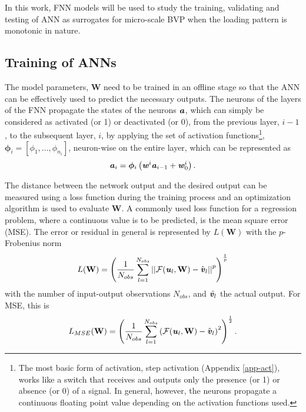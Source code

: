 In this work, FNN models will be used to study the training, validating and testing of ANN as surrogates for micro-scale BVP when the loading pattern is monotonic in nature.

\subsection{Training of ANNs}\label{nn-ann-train}

The model parameters, $\textbf{W} $ need to be trained in an offline stage so that the ANN can be effectively used to predict the necessary outputs. The neurons of the layers of the FNN propagate the states of the neurons $ \textbf{\textit{a}} $, which can simply be considered as activated (or 1) or deactivated (or 0), from the previous layer, $ i-1 $, to the subsequent layer, $ i $, by applying the set of activation functions\footnote{The most basic form of activation, step activation (Appendix \ref{app-act}), works like a switch that receives and outputs only the presence (or 1) or absence (or 0) of a signal. In general, however, the neurons propagate a continuous floating point value depending on the activation functions used.}, $ \bm\phi_{i}=[\phi_1,...,\phi_{n_{i}}] $, neuron-wise on the entire layer, which can be represented as
\begin{equation}\label{eq-nn-state}
\textbf{\textit{a}}_i=\bm\phi_{i}\left(\textbf{\textit{w}}^i\textbf{\textit{a}}_{i-1}+\textbf{\textit{w}}_0^i\right).
\end{equation}

The distance between the network output and the desired output can be measured using a loss function during the training process and an optimization algorithm is used to evaluate $ \textbf{W} $. A commonly used loss function for a regression problem, where a continuous value is to be predicted, is the mean square error (MSE). The error or residual in general is represented by $ L(\textbf{W}) $ with the $ p $-Frobenius norm
\begin{equation}\label{eq-nn-loss}
L(\textbf{W})=\left(\frac{1}{N_{obs}}\sum_{l=1}^{N_{obs}}\left|\left|\mathcal{F}(\textbf{\textit{u}}_l,\textbf{W})-\hat{\textbf{\textit{v}}}_l\right|\right|^p\right)^{\frac{1}{p}}
\end{equation}
with the number of input-output observations $ N_{obs} $, and $ \hat{\textbf{\textit{v}}_l} $ the actual output. For MSE, this is 
\begin{equation}\label{eq-nn-mse}
L_{MSE}(\textbf{W})=\left(\frac{1}{N_{obs}}\sum_{l=1}^{N_{obs}}\left({\mathcal{F}(\textbf{\textit{u}}_l,\textbf{W})-\hat{\textbf{\textit{v}}}_l}\right)^2\right)^\frac{1}{2}.
\end{equation}

